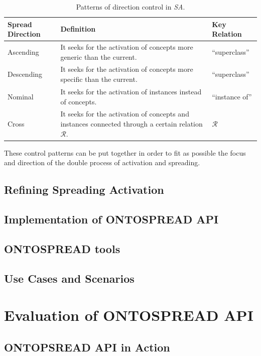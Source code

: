 \documentclass{llncs}
\begin{document}
\begin{table}[htb]

    \begin{tabular}{|p{3cm}|p{6cm}|p{3cm}|}
     \hline
      \textbf{Spread Direction} & \textbf{Definition} & \textbf{Key Relation} \\
        
	\hline
  	 Ascending& It seeks for the activation of concepts more generic than
the current. & ``superclass''\\
	\hline
  	 Descending& It seeks for the activation of concepts more specific than
the current. & ``superclass''\\
	\hline
  	 Nominal& It seeks for the activation of instances instead of concepts. &
``instance of'' \\
	\hline
  	 Cross&  It seeks for the activation of concepts and instances connected
through a certain relation $\mathcal{R}$.  & $\mathcal{R}$ \\
     \hline

    \hline	
    \end{tabular}
    \caption{Patterns of direction control in \textit{SA}.}
\label{guidingspreading}
\end{table} 

These control patterns can be put together in order to fit as possible the focus
and direction of the double process of activation and spreading.

\subsection{Refining Spreading Activation}
\subsection{Implementation of ONTOSPREAD API}
\subsection{ONTOSPREAD tools}
\subsection{Use Cases and Scenarios}
\section{Evaluation of ONTOSPREAD API}
\subsection{ONTOPSREAD API in Action}
\end{document}
